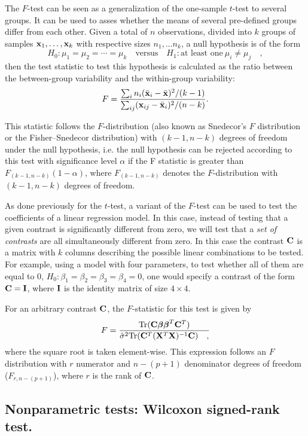 The $F$-test can be seen as a generalization of the one-sample $t$-test to several groups. It can be used to asses whether the means of several pre-defined groups differ from each other. Given a total of $n$ observations, divided into $k$ groups of samples $\mathbf{x}_1, \ldots, \mathbf{x}_k$ with respective sizes $n_1, \ldots n_k$, a null hypothesis is of the form
$$
H_0 : \mu_1 = \mu_2 = \cdots = \mu_k \quad \text{versus} \quad H_1 : \text{at least one} ~\mu_i \neq \mu_j \quad,
$$
then the test statistic to test this hypothesis is calculated as the ratio between the between-group variability and the within-group variability:
\begin{equation}\label{eq:t_test}
F = \frac{\sum_i n_i (\bar{\B{x}}_i - \bar{\B{x}})^2 / (k-1)}{\sum_{ij} (\B{x}_{ij} - \bar{\B{x}}_i)^2 / (n - k)}.
\end{equation}

This statistic follows the $F$-distribution (also known as Snedecor's $F$ distribution or the Fisher–Snedecor distribution) with $(k-1, n-k)$ degrees of freedom under the null hypothesis, i.e. the null hypothesis can be rejected according to this test with significance level $\alpha$ if the F statistic is greater than $F_{(k-1, n-k)}(1 - \alpha)$, where $F_{(k-1, n-k)}$ denotes the $F$-distribution with $(k-1, n-k)$ degrees of freedom.

{As done previously for the $t$-test, a variant of the $F$-test can be used to test the coefficients of a linear regression model. In this case, instead of testing that a given contrast is significantly different from zero, we will test that a \emph{set of contrasts} are all simultaneously different from zero. In this case the contrast $\mathbf{C}$ is a matrix with $k$ columns describing the possible linear combinations to be tested. For example, using a model with four parameters, to test whether all of them are equal to $0$, $H_0: \beta_1 = \beta_2 = \beta_3 = \beta_4 = 0$, one would specify a contrast of the form $\mathbf{C} = \mathbf{I}$, where $\mathbf{I}$ is the identity matrix of size $4 \times 4$.

For an arbitrary contrast $\mathbf{C}$, the $F$-statistic for this test is given by
$$
F = \frac{\text{Tr}(\mathbf{C}{\boldsymbol \beta} {\boldsymbol \beta}^T \mathbf{C}^T)}{
\hat{\sigma}^2 \text{Tr}({\mathbf{C}^T (\mathbf{X}^T\mathbf{X})^{-1}\mathbf{C}}) \quad,
}
$$
where the square root is taken element-wise. This expression follows an $F$ distribution with $r$ numerator and ${n - (p+1)}$ denominator degrees of freedom ($F_{r, n - (p+1)}$), where $r$ is the rank of $\mathbf{C}$.
}

\subsection{Nonparametric tests: Wilcoxon signed-rank test.}\label{subsec:wilcoxon}


